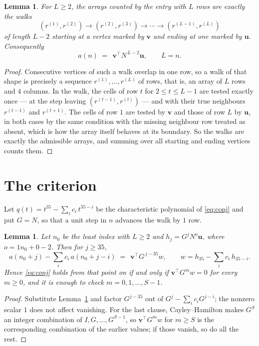 \documentclass[11pt,a4paper]{article}
\theoremstyle{plain}
\newtheorem{lemma}[theorem]{Lemma}
\theoremstyle{definition}
\begin{document}
\begin{lemma}\label{lem:walk}
For $L\ge2$, the arrays counted by the entry with $L$ rows are exactly the walks
\[
(r^{(1)},r^{(2)})\to(r^{(2)},r^{(3)})\to\cdots\to(r^{(L-1)},r^{(L)})
\]
of length $L-2$ starting at a vertex marked by $\mathbf{v}$ and ending at one marked by
$\mathbf{u}$. Consequently
\[
a(n)\;=\;\,\mathbf{v}^{\!\top}N^{\,L-2}\mathbf{u},\qquad L=n .
\]
\end{lemma}

\begin{proof}
Consecutive vertices of such a walk overlap in one row, so a walk of that shape is
precisely a sequence $r^{(1)},\dots,r^{(L)}$ of rows, that is, an array of $L$ rows
and $4$ columns. In the walk, the cells of row $t$ for $2\le t\le L-1$ are tested
exactly once --- at the step leaving $(r^{(t-1)},r^{(t)})$ --- and with their true
neighbours $r^{(t-1)}$ and $r^{(t+1)}$. The cells of row $1$ are tested by
$\mathbf{v}$ and those of row $L$ by $\mathbf{u}$, in both cases by the same condition
with the missing neighbour row treated as absent, which is how the array itself behaves at
its boundary. So the walks are exactly the admissible arrays, and summing over all starting
and ending vertices counts them.
\end{proof}

\section{The criterion}

Let $q(t)=t^{35}-\sum_i c_i\,t^{35-i}$ be the characteristic polynomial of
\eqref{eq:conj} and put $G=N$, so that a unit step in $n$ advances the walk by
$1$ row.

\begin{lemma}\label{lem:crit}
Let $n_0$ be the least index with $L\ge2$ and $h_j=G^{j}N^{o}\mathbf{u}$, where
$o=1n_0+0-2$. Then for $j\ge35$,
\[
a(n_0+j)-\sum_i c_i\,a(n_0+j-i)\;=\;\,\mathbf{v}^{\!\top}G^{\,j-35}w,
\qquad w=h_{35}-\sum_i c_i\,h_{35-i} .
\]
Hence \eqref{eq:conj} holds from that point on if and only if
$\mathbf{v}^{\!\top}G^{m}w=0$ for every $m\ge0$, and it is enough to check
$m=0,1,\dots,S-1$.
\end{lemma}

\begin{proof}
Substitute Lemma~\ref{lem:walk} and factor $G^{j-35}$ out of
$G^{j}-\sum_ic_iG^{j-i}$; the nonzero scalar $1$ does not affect
vanishing. For the last clause, Cayley--Hamilton makes $G^{S}$ an integer combination of
$I,G,\dots,G^{S-1}$, so $\mathbf{v}^{\!\top}G^{m}w$ for $m\ge S$ is the corresponding
combination of the earlier values; if those vanish, so do all the rest.
\end{proof}
\end{document}

